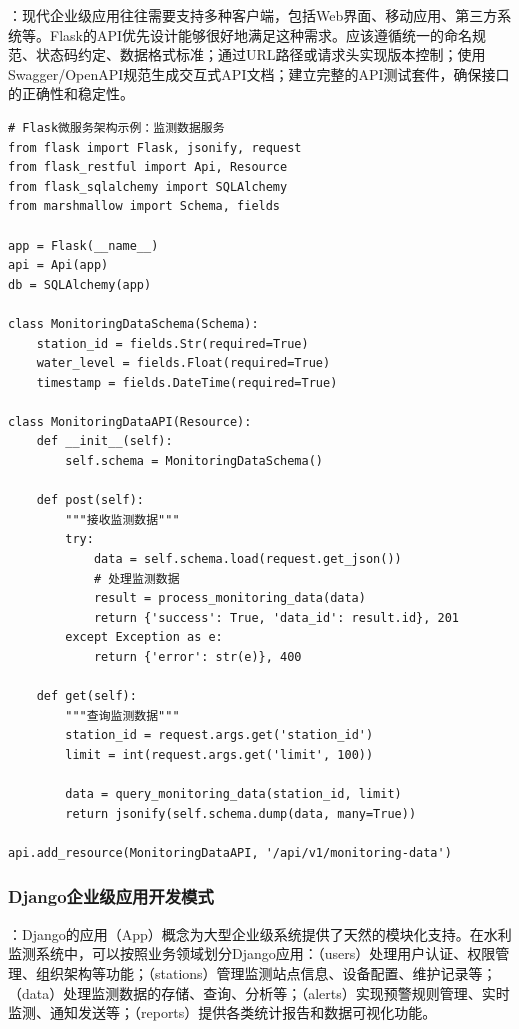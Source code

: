 ：现代企业级应用往往需要支持多种客户端，包括Web界面、移动应用、第三方系统等。Flask的API优先设计能够很好地满足这种需求。应该遵循统一的命名规范、状态码约定、数据格式标准；通过URL路径或请求头实现版本控制；使用Swagger/OpenAPI规范生成交互式API文档；建立完整的API测试套件，确保接口的正确性和稳定性。

\begin{lstlisting}[style=python]
# Flask微服务架构示例：监测数据服务
from flask import Flask, jsonify, request
from flask_restful import Api, Resource
from flask_sqlalchemy import SQLAlchemy
from marshmallow import Schema, fields

app = Flask(__name__)
api = Api(app)
db = SQLAlchemy(app)

class MonitoringDataSchema(Schema):
    station_id = fields.Str(required=True)
    water_level = fields.Float(required=True)
    timestamp = fields.DateTime(required=True)

class MonitoringDataAPI(Resource):
    def __init__(self):
        self.schema = MonitoringDataSchema()
    
    def post(self):
        """接收监测数据"""
        try:
            data = self.schema.load(request.get_json())
            # 处理监测数据
            result = process_monitoring_data(data)
            return {'success': True, 'data_id': result.id}, 201
        except Exception as e:
            return {'error': str(e)}, 400
    
    def get(self):
        """查询监测数据"""
        station_id = request.args.get('station_id')
        limit = int(request.args.get('limit', 100))
        
        data = query_monitoring_data(station_id, limit)
        return jsonify(self.schema.dump(data, many=True))

api.add_resource(MonitoringDataAPI, '/api/v1/monitoring-data')
\end{lstlisting}

\hypertarget{djangoux4f01ux4e1aux7ea7ux5e94ux7528ux5f00ux53d1ux6a21ux5f0f}{%
\subsubsection{Django企业级应用开发模式}\label{djangoux4f01ux4e1aux7ea7ux5e94ux7528ux5f00ux53d1ux6a21ux5f0f}}

：Django的应用（App）概念为大型企业级系统提供了天然的模块化支持。在水利监测系统中，可以按照业务领域划分Django应用：（users）处理用户认证、权限管理、组织架构等功能；（stations）管理监测站点信息、设备配置、维护记录等；（data）处理监测数据的存储、查询、分析等；（alerts）实现预警规则管理、实时监测、通知发送等；（reports）提供各类统计报告和数据可视化功能。

